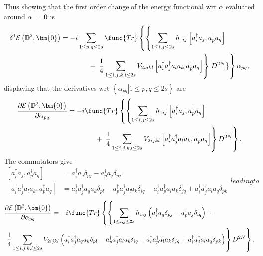 \documentclass{preprint}
\begin{document}
Thus showing that the first order change of the energy functional wrt
\textbf{$\alpha $} evaluated around \textbf{$\alpha $ }$=\bm{0}$ is
\begin{align}
\delta ^{1}\mathcal{E}\left( \mathbb{D}^{2},\bm{0}\right) & =-i\sum_{1\leq
p,q\leq 2s}\func{Tr}\left\{ \left\{ \sum_{1\leq i,j\leq 2s}h_{1ij}\left[
a_{i}^{\dagger }a_{j},a_{p}^{\dagger }a_{q}\right] \right. \right.  \notag \\
& \qquad \qquad +\left. \left. \frac{1}{4}\sum_{1\leq i,j,k,l\leq
2s}V_{2ijkl}\left[ a_{i}^{\dagger }a_{j}^{\dagger }a_{l}a_{k,}a_{p}^{\dagger
}a_{q}\right] \right\} \left. D^{2N}\right\} \right\} \alpha _{pq},
\end{align}%
displaying that the derivatives wrt $\left\{ \left. \alpha _{pq}\right\vert
1\leq p,q\leq 2s\right\} $ are
\begin{align}
\frac{\partial \mathcal{E}\left( \mathbb{D}^{2},\bm{0}\right) }{\partial
\alpha _{pq}}& =-i\func{Tr}\left\{ \left\{ \sum_{1\leq i,j\leq 2s}h_{1ij}%
\left[ a_{i}^{\dagger }a_{j},a_{p}^{\dagger }a_{q}\right] \right. \right.
\notag \\
& \qquad \qquad +\left. \left. \frac{1}{4}\sum_{1\leq i,j,k,l\leq
2s}V_{2ijkl}\left[ a_{i}^{\dagger }a_{j}^{\dagger }a_{l}a_{k},a_{p}^{\dagger
}a_{q}\right] \right\} D^{2N}\right\} .
\end{align}%
The commutators give
\begin{subequations}
\begin{align}
\left[ a_{i}^{\dagger }a_{j},a_{p}^{\dagger }a_{q}\right] & =a_{i}^{\dagger
}a_{q}\delta _{pj}-a_{p}^{\dagger }a_{j}\delta _{pj} \\
\left[ a_{i}^{\dagger }a_{j}^{\dagger }a_{l}a_{k},a_{p}^{\dagger }a_{q}%
\right] & =a_{i}^{\dagger }a_{j}^{\dagger }a_{q}a_{k}\delta
_{pl}-a_{p}^{\dagger }a_{j}^{\dagger }a_{l}a_{k}\delta _{iq}-a_{i}^{\dagger
}a_{p}^{\dagger }a_{l}a_{k}\delta _{jq}+a_{i}^{\dagger }a_{j}^{\dagger
}a_{l}a_{q}\delta _{pk}
\end{align}%
leading to
\end{subequations}
\begin{align}
& \frac{\partial \mathcal{E}\left( \mathbb{D}^{2},\bm{0}\right) }{\partial
\alpha _{pq}}=-i\func{Tr}\left\{ \left\{ \sum_{1\leq i,j\leq
2s}h_{1ij}\left( a_{i}^{\dagger }a_{q}\delta _{pj}-a_{p}^{\dagger
}a_{j}\delta _{iq}\right) \right. \right. +  \notag \\
& \left. \left. \frac{1}{4}\sum_{1\leq i,j,k,l\leq 2s}V_{2ijkl}\left(
a_{i}^{\dagger }a_{j}^{\dagger }a_{q}a_{k}\delta _{pl}-a_{p}^{\dagger
}a_{j}^{\dagger }a_{l}a_{k}\delta _{iq}-a_{i}^{\dagger }a_{p}^{\dagger
}a_{l}a_{k}\delta _{jq}+a_{i}^{\dagger }a_{j}^{\dagger }a_{l}a_{q}\delta
_{pk}\right) \right\} D^{2N}\right\} .
\end{align}%
\end{document}
